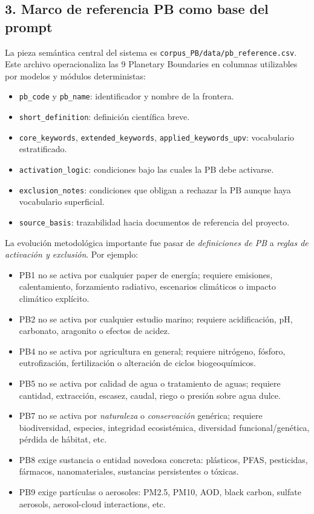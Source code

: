 \subsection{3. Marco de referencia PB como base del prompt}

La pieza semántica central del sistema es \texttt{corpus\_PB/data/pb\_reference.csv}. Este archivo operacionaliza las 9 Planetary Boundaries en columnas utilizables por modelos y módulos deterministas:

\begin{itemize}
\item \texttt{pb\_code} y \texttt{pb\_name}: identificador y nombre de la frontera.
\item \texttt{short\_definition}: definición científica breve.
\item \texttt{core\_keywords}, \texttt{extended\_keywords}, \texttt{applied\_keywords\_upv}: vocabulario estratificado.
\item \texttt{activation\_logic}: condiciones bajo las cuales la PB debe activarse.
\item \texttt{exclusion\_notes}: condiciones que obligan a rechazar la PB aunque haya vocabulario superficial.
\item \texttt{source\_basis}: trazabilidad hacia documentos de referencia del proyecto.
\end{itemize}

La evolución metodológica importante fue pasar de \emph{definiciones de PB} a \emph{reglas de activación y exclusión}. Por ejemplo:

\begin{itemize}
\item PB1 no se activa por cualquier paper de energía; requiere emisiones, calentamiento, forzamiento radiativo, escenarios climáticos o impacto climático explícito.
\item PB2 no se activa por cualquier estudio marino; requiere acidificación, pH, carbonato, aragonito o efectos de acidez.
\item PB4 no se activa por agricultura en general; requiere nitrógeno, fósforo, eutrofización, fertilización o alteración de ciclos biogeoquímicos.
\item PB5 no se activa por calidad de agua o tratamiento de aguas; requiere cantidad, extracción, escasez, caudal, riego o presión sobre agua dulce.
\item PB7 no se activa por \emph{naturaleza} o \emph{conservación} genérica; requiere biodiversidad, especies, integridad ecosistémica, diversidad funcional/genética, pérdida de hábitat, etc.
\item PB8 exige sustancia o entidad novedosa concreta: plásticos, PFAS, pesticidas, fármacos, nanomateriales, sustancias persistentes o tóxicas.
\item PB9 exige partículas o aerosoles: PM2.5, PM10, AOD, black carbon, sulfate aerosols, aerosol-cloud interactions, etc.
\end{itemize}

